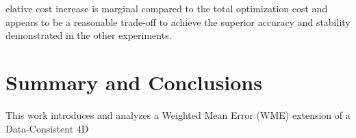 \documentclass[final,1p,times]{elsarticle}
\begin{document}
elative cost increase is marginal compared to the total optimization cost and appears to be a reasonable trade-off to achieve the superior accuracy and stability demonstrated in the other experiments. 

\section{Summary and Conclusions}

This work introduces and analyzes a Weighted Mean Error (WME) extension of a Data-Consistent 4D
\end{document}
